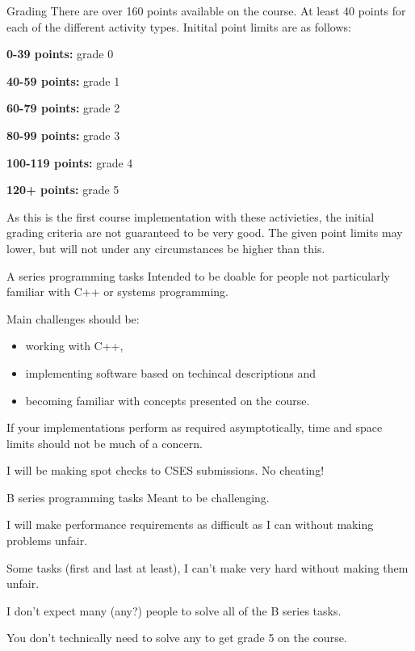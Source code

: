 \documentclass[11pt, aspectratio=169, table]{beamer}
\begin{document}
\begin{frame}{Grading}
There are over 160 points available on the course. At least 40 points for each of the different
activity types. Initital point limits are as follows:
\begin{description}
\item{{\bf 0-39 points:}} grade 0
\item{{\bf 40-59 points:}} grade 1
\item{{\bf 60-79 points:}} grade 2
\item{{\bf 80-99 points:}} grade 3
\item{{\bf 100-119 points:}} grade 4
\item{{\bf 120+ points:}} grade 5
\end{description}

As this is the first course implementation with these activieties, the initial grading criteria 
are not guaranteed to be very good. The given point limits may lower, but will not under any 
circumstances be higher than this.
\end{frame}

\begin{frame}{A series programming tasks}
\setlength\parskip{\fill}
Intended to be doable for people not particularly familiar with C++ or systems programming.

Main challenges should be:
\begin{itemize}
	\item working with C++,
	\item implementing software based on techincal descriptions and
	\item becoming familiar with concepts presented on the course.
\end{itemize}

If your implementations perform as required asymptotically, time and space limits should not be much of a concern.

I will be making spot checks to CSES submissions. No cheating!
\end{frame}

\begin{frame}{B series programming tasks} 
\setlength\parskip{\fill}
Meant to be challenging.

I will make performance requirements as difficult as I can without making problems unfair.

Some tasks (first and last at least), I can't make very hard without making them unfair.

I don't expect many (any?) people to solve all of the B series tasks.

You don't technically need to solve any to get grade 5 on the course.
\end{frame}
\end{document}
